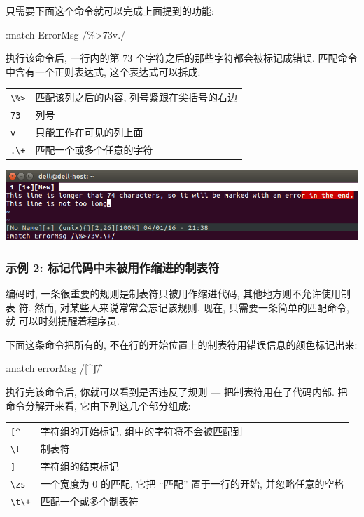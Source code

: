 只需要下面这个命令就可以完成上面提到的功能:
\begin{vimcmd}
:match ErrorMsg /\%>73v.\+/
\end{vimcmd}
执行该命令后, 一行内的第 73 个字符之后的那些字符都会被标记成错误. 匹配命令 
中含有一个正则表达式, 这个表达式可以拆成:
\begin{center}
\begin{tabular}{ll}
    \hline
    \verb'\%>'  & 匹配该列之后的内容, 列号紧跟在尖括号的右边 \\
    \verb'73'   & 列号  \\
    \verb'v'    & 只能工作在可见的列上面 \\
    \verb'.\+'  & 匹配一个或多个任意的字符 \\
    \hline
\end{tabular}
\end{center}
\begin{center}
    \includegraphics[scale=0.6]{./images/page24.png}
\end{center}
\subsubsection{示例 2: 标记代码中未被用作缩进的制表符}
\label{subsubsec:mark_tabs_not_used_for_indentation_in_code}
编码时, 一条很重要的规则是制表符只被用作缩进代码, 其他地方则不允许使用制表
符. 然而, 对某些人来说常常会忘记该规则. 现在, 只需要一条简单的匹配命令, 就
可以时刻提醒着程序员.

下面这条命令把所有的, 不在行的开始位置上的制表符用错误信息的颜色标记出来:
\begin{vimcmd}
:match errorMsg /[^\t]\zs\t\+/
\end{vimcmd}
执行完该命令后, 你就可以看到是否违反了规则 --- 把制表符用在了代码内部. 把
命令分解开来看, 它由下列这几个部分组成:
\begin{center}
    \begin{tabular}{ll}
        \hline
        \verb'[^'   & 字符组的开始标记, 组中的字符将不会被匹配到 \\
        \verb'\t'   & 制表符 \\
        \verb']'    & 字符组的结束标记 \\
        \verb'\zs'  & 一个宽度为 0 的匹配, 它把 ``匹配'' 置于一行的开始,
        并忽略任意的空格 \\
        \verb'\t\+' & 匹配一个或多个制表符 \\
        \hline
    \end{tabular}
\end{center}

